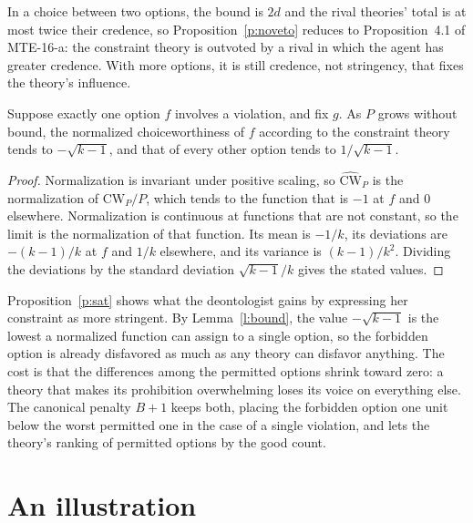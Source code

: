 \documentclass{situationist-preprint}
\begin{document}
In a choice between two options, the bound is $2d$ and the rival theories' total is at most twice their credence, so Proposition~\ref{p:noveto} reduces to Proposition~4.1 of MTE-16-a: the constraint theory is outvoted by a rival in which the agent has greater credence. With more options, it is still credence, not stringency, that fixes the theory's influence.

\begin{proposition}[Saturation]\label{p:sat}
Suppose exactly one option $f$ involves a violation, and fix $g$. As $P$ grows without bound, the normalized choiceworthiness of $f$ according to the constraint theory tends to $-\sqrt{k-1}$, and that of every other option tends to $1/\sqrt{k-1}$.
\end{proposition}

\begin{proof}
Normalization is invariant under positive scaling, so $\widehat{\mathrm{CW}}_P$ is the normalization of $\mathrm{CW}_P/P$, which tends to the function that is $-1$ at $f$ and $0$ elsewhere. Normalization is continuous at functions that are not constant, so the limit is the normalization of that function. Its mean is $-1/k$, its deviations are $-(k-1)/k$ at $f$ and $1/k$ elsewhere, and its variance is $(k-1)/k^2$. Dividing the deviations by the standard deviation $\sqrt{k-1}/k$ gives the stated values.
\end{proof}

Proposition~\ref{p:sat} shows what the deontologist gains by expressing her constraint as more stringent. By Lemma~\ref{l:bound}, the value $-\sqrt{k-1}$ is the lowest a normalized function can assign to a single option, so the forbidden option is already disfavored as much as any theory can disfavor anything. The cost is that the differences among the permitted options shrink toward zero: a theory that makes its prohibition overwhelming loses its voice on everything else. The canonical penalty $B+1$ keeps both, placing the forbidden option one unit below the worst permitted one in the case of a single violation, and lets the theory's ranking of permitted options by the good count.

\section{An illustration}
\end{document}

